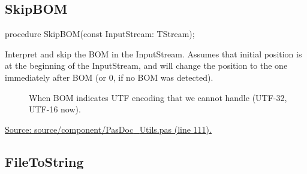 \documentclass{report}
\newif\ifpdf
\begin{document}
\subsection*{SkipBOM}
\fi
\label{PasDoc_Utils-SkipBOM}
\begin{list}{}{
\setlength{\itemindent}{0cm}
\setlength{\listparindent}{0cm}
\setlength{\leftmargin}{\evensidemargin}
\addtolength{\leftmargin}{\tmplength}
\settowidth{\labelsep}{X}
\addtolength{\leftmargin}{\labelsep}
\setlength{\labelwidth}{\tmplength}
}
\item[\textbf{Declaration}\hfill]
\ifpdf
\begin{flushleft}
\fi
\begin{ttfamily}
procedure SkipBOM(const InputStream: TStream);\end{ttfamily}

\ifpdf
\end{flushleft}
\fi

\par
\item[\textbf{Description}]
Interpret and skip the BOM in the InputStream. Assumes that initial position is at the beginning of the InputStream, and will change the position to the one immediately after BOM (or 0, if no BOM was detected).

\par
\item[\textbf{Exceptions}]
\begin{description}
\item[\begin{ttfamily}EPasDoc\end{ttfamily}(\ref{PasDoc_Types.EPasDoc})] When BOM indicates UTF encoding that we cannot handle (UTF{-}32, UTF{-}16 now).
\end{description}
\par
\href{https://github.com/pasdoc/pasdoc/blob/master/source/component/PasDoc_Utils.pas#L111}{Source: source/component/PasDoc{\_}Utils.pas (line 111).}

\end{list}
\ifpdf
\subsection*{\large{\textbf{FileToString}}\normalsize\hspace{1ex}\hrulefill}
\else
\end{document}
